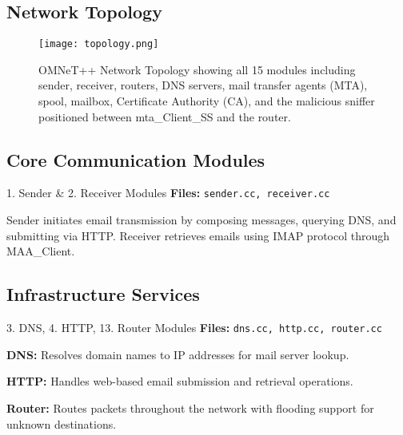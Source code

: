\documentclass[a4paper,12pt]{extarticle}
\newcommand{\code}[1]{\texttt{\colorbox{codebackground}{#1}}}
\begin{document}
\vspace{0.5cm}

\subsection*{Network Topology}

\begin{figure}[H]
    \centering
    \texttt{[image: topology.png]}
    \caption{OMNeT++ Network Topology showing all 15 modules including sender, receiver, routers, DNS servers, mail transfer agents (MTA), spool, mailbox, Certificate Authority (CA), and the malicious sniffer positioned between mta\_Client\_SS and the router.}
    \label{fig:topology}
\end{figure}

\vspace{0.5cm}

\subsection{Core Communication Modules}

\begin{modulebox}{1. Sender \& 2. Receiver Modules}
\textbf{Files:} \code{sender.cc, receiver.cc}

Sender initiates email transmission by composing messages, querying DNS, and submitting via HTTP. Receiver retrieves emails using IMAP protocol through MAA\_Client.
\end{modulebox}

\vspace{0.5cm}

\subsection{Infrastructure Services}

\begin{modulebox}{3. DNS, 4. HTTP, 13. Router Modules}
\textbf{Files:} \code{dns.cc, http.cc, router.cc}

\textbf{DNS:} Resolves domain names to IP addresses for mail server lookup.

\textbf{HTTP:} Handles web-based email submission and retrieval operations.

\textbf{Router:} Routes packets throughout the network with flooding support for unknown destinations.
\end{modulebox}

\vspace{0.5cm}
\end{document}
